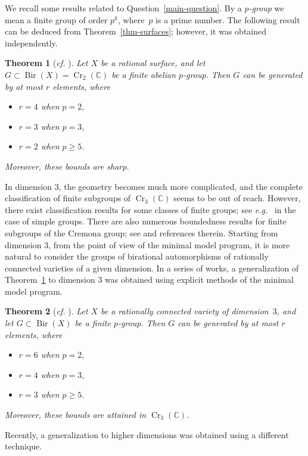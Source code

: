 \documentclass[11pt]{amsart}
\numberwithin{equation}{section}
\newtheorem{thm}{Theorem}[section]
\theoremstyle{definition}
\theoremstyle{remark}
\DeclareMathOperator{\Cr}{Cr}
\DeclareMathOperator{\Bir}{Bir}
\begin{document}
We recall some results related to Question~\ref{main-question}.  By a \emph{$p$-group} we mean a finite group of order $p^k$, where~$p$ is a prime number.  The following result can be deduced from Theorem~\ref{thm-surfaces}; however, it was obtained independently.

\begin{thm}[\textit{cf.} {\cite{Beau07}}]
\label{thm-p-surfaces}
Let $X$ be a rational surface, and let $G\subset \Bir(X)=\Cr_2(\mathbb{C})$ be a
finite abelian $p$-group. Then $G$ can be generated by at most $r$
elements, where
\begin{itemize}
\item
$r=4$ when $p=2$,
\item
$r=3$ when $p=3$,
\item
$r=2$ when $p\geq 5$.
\end{itemize}
Moreover, these bounds are sharp.
\end{thm}

In dimension $3$, the geometry becomes much more complicated, and the complete classification of finite subgroups of $\Cr_3(\mathbb{C})$ seems to be out of reach.
However, there exist classification results for some classes of finite groups; see \textit{e.g.}~\cite{Pr09} in the case of simple groups. There are also numerous boundedness results for finite subgroups of the Cremona group; see \cite{PS16} and references therein. Starting from dimension $3$, from the point of view of the minimal model program, it is more natural to consider the groups of birational automorphisms of rationally connected varieties of a given dimension. In a series of works, a generalization of Theorem~\ref{thm-p-surfaces} to dimension $3$ was obtained using explicit methods of the minimal model program. 

\begin{thm}[\textit{cf.} {\cite{Pr11,Pr14,PS17,Kuz20,Xu20,Lo22}}]
\label{thm-threefolds}
Let $X$ be a rationally connected variety of dimension~$3$, and let
$G\subset \Bir(X)$ be a finite $p$-group. Then $G$ can be
generated by at most $r$ elements, where
\begin{itemize}
\item
$r=6$ when $p=2$,
\item
$r=4$ when $p=3$,
\item
$r=3$ when $p\geq 5$.
\end{itemize}
Moreover, these bounds are attained in $\Cr_3(\mathbb{C})$.
\end{thm}

Recently, a generalization to higher dimensions was obtained using a different technique.
\end{document}
